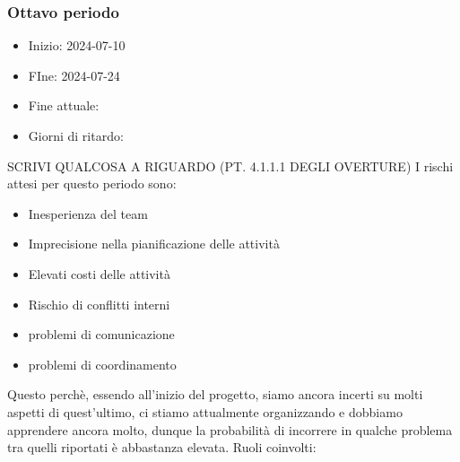     \subsubsection{Ottavo periodo}
    \begin{itemize}
        \item Inizio: 2024-07-10
        \item FIne: 2024-07-24
        \item Fine attuale:
        \item Giorni di ritardo:
    \end{itemize}
    SCRIVI QUALCOSA A RIGUARDO (PT. 4.1.1.1 DEGLI OVERTURE)
    I rischi attesi per questo periodo sono:
    \begin{itemize}
        \item Inesperienza del team
        \item Imprecisione nella pianificazione delle attività
        \item Elevati costi delle attività
        \item Rischio di conflitti interni 
        \item problemi di comunicazione
        \item problemi di coordinamento
    \end{itemize}
    Questo perchè, essendo all’inizio del progetto, siamo ancora incerti su molti aspetti di quest’ultimo, ci stiamo attualmente organizzando e dobbiamo apprendere ancora molto, dunque la probabilità di incorrere in qualche problema tra quelli riportati è abbastanza elevata.
    Ruoli coinvolti: 




